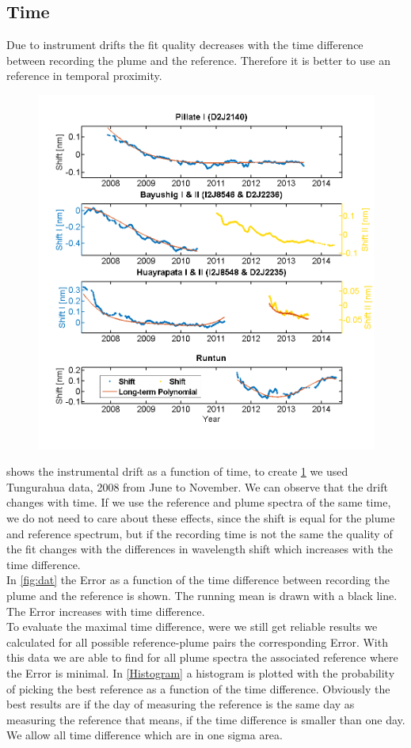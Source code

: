 \documentclass  [
  paper    = a4,
  BCOR     = 10mm,
  twoside,
  fontsize = 12pt,
  fleqn,
  toc      = bibnumbered,
  toc      = listofnumbered,
  numbers  = noendperiod,
  headings = normal,
  listof   = leveldown,
  version  = 3.03
]                                       {scrreprt}
\begin{document}
	
	\subsection{Time}
	Due to instrument drifts the fit quality decreases with the time difference between recording the plume and the reference. Therefore it is better to use an reference in temporal proximity.\\
	\begin{figure}[h]
		\centering
		\includegraphics[width=0.7\linewidth]{Bilder/Simon/Bilder_Tung/Drift_Komplett_NEW}
		\caption{}
		\label{fig:driftkomplettnew}
	\end{figure}
	 shows the instrumental drift as a function of time, to create \cref{fig:driftkomplettnew} we used Tungurahua data, 2008 from June to November. We can observe that the drift changes with time. If we use the reference and plume spectra of the same time, we do not need to care about these effects, since the shift is equal for the plume and reference spectrum, but if the recording time is not the same the quality of the fit changes with the differences in wavelength shift which increases with the time difference.\\
	In \cref{fig:dat} the  Error as a function of the time difference between recording the plume and the reference is shown. The running mean is drawn with a black line. The  Error increases with time difference.\\
	To evaluate the maximal time difference, were we still get reliable results we calculated for all possible reference-plume pairs the corresponding  Error. With this data we are able to find for all plume spectra the associated reference where the  Error is minimal. In \cref{Histogram} a histogram is plotted with the probability of picking the best reference as a function of the time difference. Obviously the best results are if the day of measuring the reference is the same day as measuring the reference that means, if the time difference is smaller than one day. We allow all time difference which are in one sigma area. 
	
\end{document}
